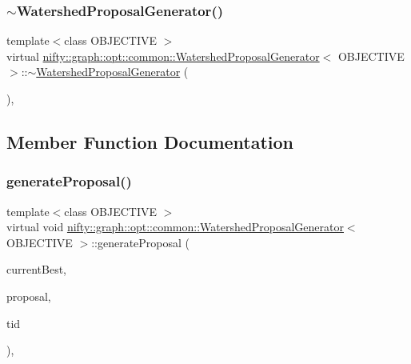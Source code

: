 \subsubsection{\texorpdfstring{$\sim$\+Watershed\+Proposal\+Generator()}{~WatershedProposalGenerator()}}
{\footnotesize\ttfamily template$<$class O\+B\+J\+E\+C\+T\+I\+VE $>$ \\
virtual \hyperlink{classnifty_1_1graph_1_1opt_1_1common_1_1WatershedProposalGenerator}{nifty\+::graph\+::opt\+::common\+::\+Watershed\+Proposal\+Generator}$<$ O\+B\+J\+E\+C\+T\+I\+VE $>$\+::$\sim$\hyperlink{classnifty_1_1graph_1_1opt_1_1common_1_1WatershedProposalGenerator}{Watershed\+Proposal\+Generator} (\begin{DoxyParamCaption}{ }\end{DoxyParamCaption})\hspace{0.3cm}{\ttfamily [inline]}, {\ttfamily [virtual]}}



\subsection{Member Function Documentation}
\mbox{\label{classnifty_1_1graph_1_1opt_1_1common_1_1WatershedProposalGenerator_a0dadaa8e06ec15ac6e892ecc2fa6ad97}} 
\subsubsection{\texorpdfstring{generate\+Proposal()}{generateProposal()}}
{\footnotesize\ttfamily template$<$class O\+B\+J\+E\+C\+T\+I\+VE $>$ \\
virtual void \hyperlink{classnifty_1_1graph_1_1opt_1_1common_1_1WatershedProposalGenerator}{nifty\+::graph\+::opt\+::common\+::\+Watershed\+Proposal\+Generator}$<$ O\+B\+J\+E\+C\+T\+I\+VE $>$\+::generate\+Proposal (\begin{DoxyParamCaption}\item[{const \hyperlink{classnifty_1_1graph_1_1opt_1_1common_1_1ProposalGeneratorBase_a122993da5c326628cdb865a6279d20c5}{Proposal\+Type} \&}]{current\+Best,  }\item[{\hyperlink{classnifty_1_1graph_1_1opt_1_1common_1_1ProposalGeneratorBase_a122993da5c326628cdb865a6279d20c5}{Proposal\+Type} \&}]{proposal,  }\item[{const size\+\_\+t}]{tid }\end{DoxyParamCaption})\hspace{0.3cm}{\ttfamily [inline]}, {\ttfamily [virtual]}}



